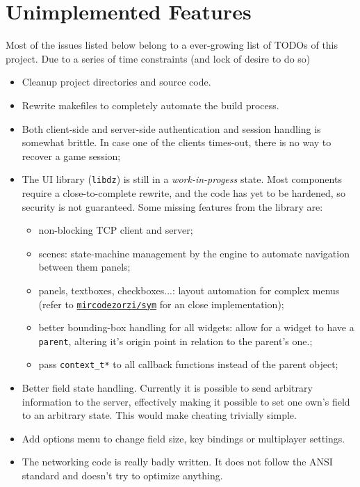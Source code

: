 \documentclass{report}
\begin{document}
\section{Unimplemented Features}

Most of the issues listed below belong to a ever-growing list of TODOs of this project. Due to a series of time constraints (and lock of desire to do so) 

\begin{itemize}
  \item Cleanup project directories and source code.
  \item Rewrite makefiles to completely automate the build process.
  \item Both client-side and server-side authentication and session handling is somewhat brittle. In case one of the clients times-out, there is no way to recover a game session;
  \item The UI library (\texttt{libdz}) is still in a \textit{work-in-progess} state. Most components require a close-to-complete rewrite, and the code has yet to be hardened, so security is not guaranteed. Some missing features from the library are:
  \begin{itemize}
    \item non-blocking TCP client and server;
    \item scenes: state-machine management by the engine to automate navigation between them panels;
    \item panels, textboxes, checkboxes...: layout automation for complex menus (refer to \href{https://github.com/mircodezorzi/sym}{\texttt{mircodezorzi/sym}} for an close implementation);
    \item better bounding-box handling for all widgets: allow for a widget to have a \texttt{parent}, altering it's origin point in relation to the parent's one.;
    \item pass \texttt{context\_t*} to all callback functions instead of the parent object;
  \end{itemize}
  \item Better field state handling. Currently it is possible to send arbitrary information to the server, effectively making it possible to set one own's field to an arbitrary state. This would make cheating trivially simple.
  \item Add options menu to change field size, key bindings or multiplayer settings.
  \item The networking code is really badly written. It does not follow the ANSI standard and doesn't try to optimize anything.

\end{itemize}
\end{document}
